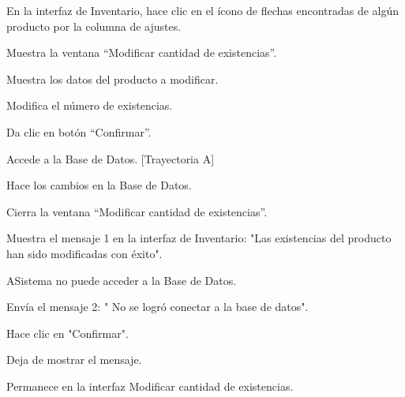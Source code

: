 \begin{UCtrayectoria}
	
	\UCpaso[\UCactor] En la interfaz de Inventario, hace clic en el ícono de flechas encontradas de algún producto por la columna de ajustes.
	
	\UCpaso[\UCsist] Muestra la ventana “Modificar cantidad de existencias”.

	\UCpaso[\UCsist] Muestra los datos del producto a modificar.
 	
	\UCpaso[\UCactor] Modifica el número de existencias.
	
	\UCpaso[\UCactor] Da clic en botón “Confirmar”.

	\UCpaso[\UCsist] Accede a la Base de Datos. [Trayectoria A]

	\UCpaso[\UCsist] Hace los cambios en la Base de Datos.

	\UCpaso[\UCsist] Cierra la ventana “Modificar cantidad de existencias”.

	\UCpaso[\UCsist] Muestra el mensaje 1 en la interfaz de Inventario: "Las existencias del producto han sido modificadas con éxito".

	
\end{UCtrayectoria}

\begin{UCtrayectoriaA}{A}{Sistema no puede acceder a la Base de Datos.}
	
	\UCpaso[\UCsist] Envía el mensaje 2: " No se logró conectar a la base de datos".
	
	\UCpaso[\UCactor] Hace clic en "Confirmar".

	\UCpaso[\UCsist] Deja de mostrar el mensaje.

	\UCpaso[] Permanece en la interfaz Modificar cantidad de existencias.

\end{UCtrayectoriaA}

